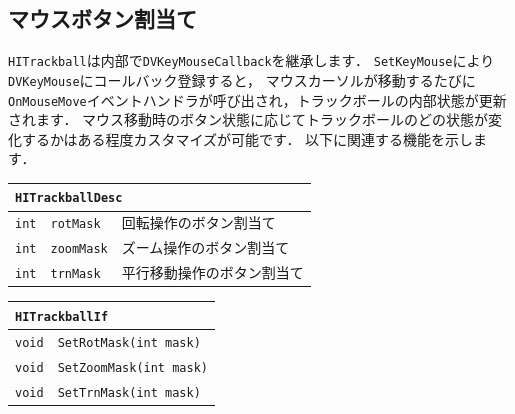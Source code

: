 \subsection*{\KLUDGE マウスボタン割当て}

\texttt{HITrackball}\KLUDGE は内部で\texttt{DVKeyMouseCallback}\KLUDGE を継承します．
\texttt{SetKeyMouse}\KLUDGE により\texttt{DVKeyMouse}\KLUDGE にコールバック登録すると，
\KLUDGE マウスカーソルが移動するたびに\texttt{OnMouseMove}\KLUDGE イベントハンドラが呼び出され，トラックボールの内部状態が更新されます．
\KLUDGE マウス移動時のボタン状態に応じてトラックボールのどの状態が変化するかはある程度カスタマイズが可能です．
\KLUDGE 以下に関連する機能を示します．

\begin{center}
\begin{tabular}{p{.15\hsize}p{.35\hsize}p{.4\hsize}}
\multicolumn{3}{l}{\texttt{HITrackballDesc}}		\\ \midrule
\texttt{int}	& \texttt{rotMask}		& \KLUDGE 回転操作のボタン割当て		\\
\texttt{int}	& \texttt{zoomMask}		& \KLUDGE ズーム操作のボタン割当て		\\
\texttt{int}	& \texttt{trnMask}		& \KLUDGE 平行移動操作のボタン割当て	\\
\end{tabular}
\end{center}

\begin{center}
\begin{tabular}{p{.15\hsize}p{.75\hsize}}
\multicolumn{2}{l}{\texttt{HITrackballIf}}			\\ \midrule
\texttt{void} 	& \texttt{SetRotMask(int mask)}		\\
\texttt{void} 	& \texttt{SetZoomMask(int mask)}	\\
\texttt{void} 	& \texttt{SetTrnMask(int mask)}		\\
\end{tabular}
\end{center}

